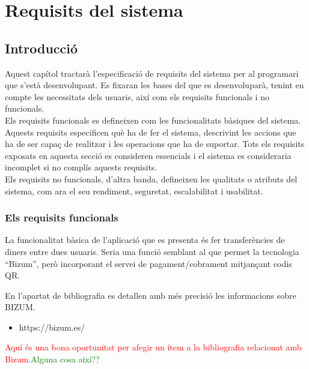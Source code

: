 \documentclass[a4paper,12pt,twoside]{ThesisStyle}
\newcommand{\pau}[1]{\textcolor{red}{#1}}
\newcommand{\sudan}[1]{\textcolor{green}{#1}}
\begin{document}
\chapter{Requisits del sistema}
\label{chp:requisits}




\section{Introducció}
\label{subsec:Introducció}

Aquest capítol tractarà l'especificació de requisits del sistema per al programari que s'està desenvolupant. Es fixaran les bases del que es desenvoluparà, tenint en compte les necessitats dels usuaris, així com els requisits funcionals i no funcionals.\\

Els requisits funcionals es defineixen com les funcionalitats bàsiques del sistema. Aquests requisits especificen què ha de fer el sistema, descrivint les accions que ha de ser capaç de realitzar i les operacions que ha de suportar. Tots els requisits exposats en aquesta secció es consideren essencials i el sistema es consideraria incomplet si no complís aquests requisits.\\

Els requisits no funcionals, d'altra banda, defineixen les qualitats o atributs del sistema, com ara el seu rendiment, seguretat, escalabilitat i usabilitat.




\subsection{Els requisits funcionals}
\label{subsec:Els requisits funcionals}


La funcionalitat bàsica de l'aplicació que es presenta és fer transferències de diners entre dues usuaris. Seria una funció semblant al que permet la tecnologia ``Bizum'', però incorporant el servei de pagament/cobrament mitjançant codis QR. 

En l'apartat de bibliografia es detallen amb més precisió les informacions sobre BIZUM.

\begin{itemize}
    \item https://bizum.es/
\end{itemize}

\pau{Aquí és una bona oportunitat per afegir un ítem a la bibliografia relacionat amb Bizum.}\sudan{Alguna cosa així??}
\end{document}

